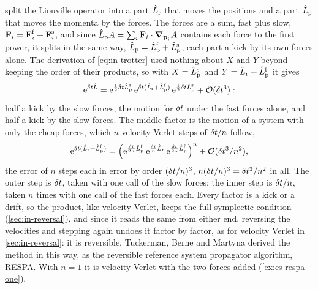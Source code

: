  split the Liouville operator into a part
$\hat{L}_{\mathrm r}$ that moves the positions and a part $\hat{L}_{\mathrm
p}$ that moves the momenta by the forces. The forces are a sum, fast plus
slow, $\bm{\mathrm{F}}_i = \bm{\mathrm{F}}_i^{\mathrm f} + \bm{\mathrm{F}}_i^{\mathrm s}$, and since
$\hat{L}_{\mathrm p}A = \sum_i\bm{\mathrm{F}}_i\cdot\bm{\nabla}_{\bm{\mathrm{p}}_i}A$ contains each
force to the first power, it splits in the same way, $\hat{L}_{\mathrm p} =
\hat{L}_{\mathrm p}^{\mathrm f} + \hat{L}_{\mathrm p}^{\mathrm s}$, each part a
kick by its own forces alone. The derivation of \cref{eq:in-trotter}
used nothing about $X$ and $Y$ beyond keeping the order of their products,
so with $X = \hat{L}_{\mathrm p}^{\mathrm s}$ and $Y = \hat{L}_{\mathrm r} +
\hat{L}_{\mathrm p}^{\mathrm f}$ it gives
\begin{equation*}
   \mathrm{e}^{\delta t\hat{L}} = \mathrm{e}^{\frac12\delta t\hat{L}_{\mathrm p}^{\mathrm s}}
   \,\mathrm{e}^{\delta t(\hat{L}_{\mathrm r} + \hat{L}_{\mathrm p}^{\mathrm f})}\,
   \mathrm{e}^{\frac12\delta t\hat{L}_{\mathrm p}^{\mathrm s}} + \mathcal{O}(\delta t^3) :
\end{equation*}
half a kick by the slow forces, the motion for $\delta t$ under the fast forces
alone, and half a kick by the slow forces. The middle factor is the
motion of a system with only the cheap forces, which $n$ velocity Verlet
steps of $\delta t/n$ follow,
\begin{equation*}
   \mathrm{e}^{\delta t(\hat{L}_{\mathrm r} + \hat{L}_{\mathrm p}^{\mathrm f})}
   = \Bigl(\mathrm{e}^{\frac{\delta t}{2n}\hat{L}_{\mathrm p}^{\mathrm f}}\,
   \mathrm{e}^{\frac{\delta t}{n}\hat{L}_{\mathrm r}}\,
   \mathrm{e}^{\frac{\delta t}{2n}\hat{L}_{\mathrm p}^{\mathrm f}}\Bigr)^n
   + \mathcal{O}(\delta t^3/n^2) ,
\end{equation*}
the error of $n$ steps each in error by order $(\delta t/n)^3$, $n(\delta t/n)^3
= \delta t^3/n^2$ in all. The outer
step is $\delta t$, taken with one call of the slow forces; the inner step is
$\delta t/n$, taken $n$ times with one call of the fast forces each. Every factor is a
kick or a drift, so the product, like velocity Verlet, keeps the full
symplectic condition (\cref{sec:in-reversal}), and since it reads the same
from either end, reversing the velocities and stepping again undoes it
factor by factor, as for velocity Verlet in \cref{sec:in-reversal}: it is
reversible. Tuckerman, Berne and Martyna derived the
method in this way, as the reversible reference system propagator
algorithm, RESPA\cite{Tuckerman1992}. With $n = 1$ it is velocity Verlet
with the two forces added (\cref{ex:cs-respa-one}).

